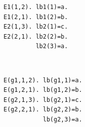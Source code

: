 \begin{minipage}[t]{0.45\linewidth}
\begin{lstlisting}[mathescape,caption=Multiple individual global relations,label=lst:multiglobal]
E1(1,2). lb1(1)=a.
E1(2,1). lb1(2)=b.
E2(1,3). lb2(1)=c.
E2(2,1). lb2(2)=b.
         lb2(3)=a.
\end{lstlisting}
\end{minipage}
\begin{minipage}[t]{0.1\linewidth}
 ~
\end{minipage}
\begin{minipage}[t]{0.45\linewidth}
\begin{lstlisting}[mathescape,caption=Disjoint union using indexed global relations,label=lst:indexedglobal]
E(g1,1,2). lb(g1,1)=a.
E(g1,2,1). lb(g1,2)=b.
E(g2,1,3). lb(g2,1)=c.
E(g2,2,1). lb(g2,2)=b.
           lb(g2,3)=a.
\end{lstlisting}
\end{minipage}




